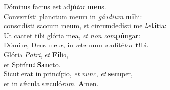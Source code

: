 \oddverse Dóminus factus est adjú\textit{tor} \textbf{me}us.\\
\evenverse Convertísti planctum meum in \textit{gáu}\textit{di}\textit{um} \textbf{mi}hi:~\*\\
\evenverse conscidísti saccum meum, et circumdedísti me \textit{læ}\textbf{tí}tia:\\
\oddverse Ut cantet tibi glória mea, \textit{et} \textit{non} \textit{com}\textbf{pún}gar:~\*\\
\oddverse Dómine, Deus meus, in ætérnum confité\textit{bor} \textbf{ti}bi.\\
\evenverse Glória \textit{Pa}\textit{tri}, \textit{et} \textbf{Fí}lio,~\*\\
\evenverse et Spirítu\textit{i} \textbf{San}cto.\\
\oddverse Sicut erat in princípio, \textit{et} \textit{nunc}, \textit{et} \textbf{sem}per,~\*\\
\oddverse et in sǽcula sæculó\textit{rum}. \textbf{A}men.\\
